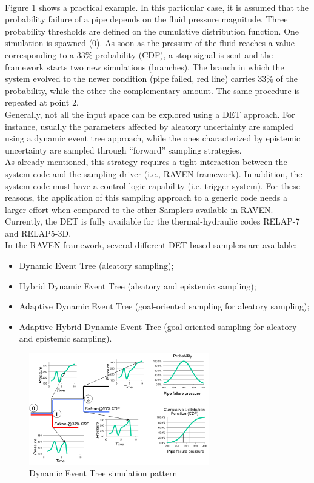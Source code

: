 \\Figure \ref{fig:DETschemeExample} shows a practical example. In this particular case, it is assumed that the
probability failure of a pipe depends on the fluid pressure magnitude. Three probability thresholds are defined on
the cumulative distribution function. One simulation is spawned (0). As soon as the pressure of the fluid reaches a
value corresponding to a 33\% probability (CDF), a stop signal is sent and the framework starts two new
simulations (branches). The branch in which the system evolved to the newer condition (pipe failed, red line)
carries 33\% of the probability, while the other the complementary amount. The same procedure is repeated at
point 2.
\\Generally, not all the input space can be explored using a DET approach. For instance, usually the parameters affected by aleatory uncertainty are sampled using a dynamic event tree approach, while the ones characterized by epistemic uncertainty are sampled through ``forward'' sampling strategies.
\\As already mentioned, this strategy requires a tight interaction between the system code and the sampling driver (i.e., RAVEN framework). In addition, the system code must have a control logic capability (i.e. trigger system). For these reasons, the application of this sampling approach to a generic code needs a larger effort when compared to the other Samplers available in RAVEN. Currently, the DET is fully available for the thermal-hydraulic codes RELAP-7 and RELAP5-3D.
\\In the RAVEN framework, several different DET-based samplers are available:
\begin{itemize}
\item Dynamic Event Tree (aleatory sampling);
\item Hybrid Dynamic Event Tree (aleatory and epistemic sampling);
\item Adaptive Dynamic Event Tree (goal-oriented sampling for aleatory sampling);
\item Adaptive Hybrid Dynamic Event Tree (goal-oriented sampling for aleatory and epistemic sampling).
\end{itemize}

\begin{figure}
  \centering
  \includegraphics[width=0.7\textwidth]  {pics/DETscheme.png}
  \caption{Dynamic Event Tree simulation pattern}
  \label{fig:DETschemeExample}
\end{figure}

